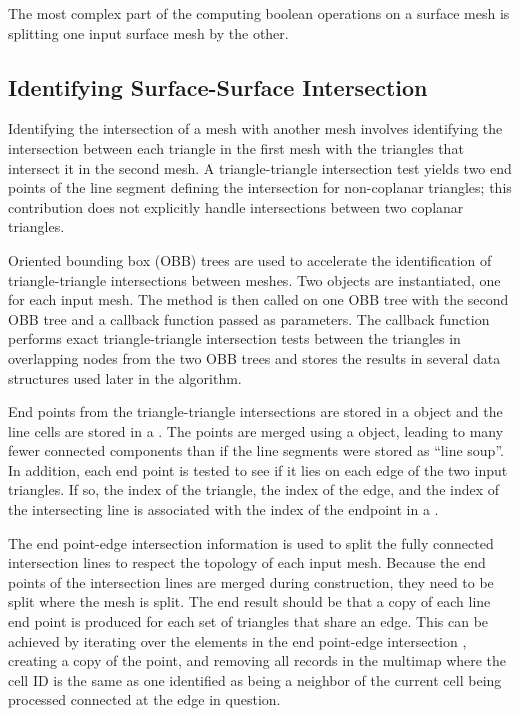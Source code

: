 \documentclass{InsightArticle}
\begin{document}
The most complex part of the computing boolean operations on a surface mesh is splitting one input surface mesh by the other. 

\subsection{Identifying Surface-Surface Intersection}

Identifying the intersection of a mesh with another mesh involves identifying the intersection between each triangle in the first mesh with the triangles that intersect it in the second mesh. A triangle-triangle intersection test yields two end points of the line segment defining the intersection for non-coplanar triangles; this contribution does not explicitly handle intersections between two coplanar triangles. 

Oriented bounding box (OBB) trees are used to accelerate the identification of triangle-triangle intersections between meshes. Two  objects are instantiated, one for each input mesh. The method  is then called on one OBB tree with the second OBB tree and a callback function passed as parameters. The callback function performs exact triangle-triangle intersection tests between the triangles in overlapping nodes from the two OBB trees and stores the results in several data structures used later in the algorithm.

End points from the triangle-triangle intersections are stored in a  object and the line cells are stored in a . The points  are merged using a  object, leading to many fewer connected components than if the line segments were stored as ``line soup''. In addition, each end point is tested to see if it lies on each edge of the two input triangles. If so, the index of the triangle, the index of the edge, and the index of the intersecting line is associated with the index of the endpoint in a .

The end point-edge intersection information is used to split the fully connected intersection lines to respect the topology of each input mesh. Because the end points of the intersection lines are merged during construction, they need to be split where the mesh is split. The end result should be that a copy of each line end point is produced for each set of triangles that share an edge. This can be achieved by iterating over the elements in the end point-edge intersection , creating a copy of the point, and removing all records in the multimap where the cell ID is the same as one identified as being a neighbor of the current cell being processed connected at the edge in question.
\end{document}
